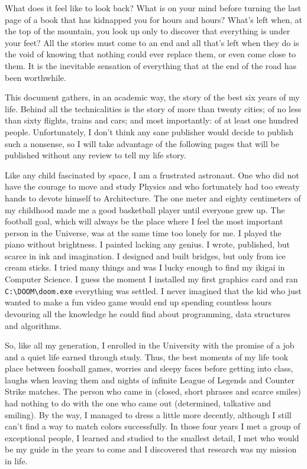What does it feel like to look back? What is on your mind before turning the last page of a book that has kidnapped you for hours and hours? What's left when, at the top of the mountain, you look up only to discover that everything is under your feet? All the stories must come to an end and all that's left when they do is the void of knowing that nothing could ever replace them, or even come close to them. It is the inevitable sensation of everything that at the end of the road has been worthwhile.

This document gathers, in an academic way, the story of the best six years of my life. Behind all the technicalities is the story of more than twenty cities; of no less than sixty flights, trains and cars; and most importantly: of at least one hundred people. Unfortunately, I don't think any sane publisher would decide to publish such a nonsense, so I will take advantage of the following pages that will be published without any review to tell my life story.

Like any child fascinated by space, I am a frustrated astronaut. One who did not have the courage to move and study Physics and who fortunately had too sweaty hands to devote himself to Architecture. The one meter and eighty centimeters of my childhood made me a good basketball player until everyone grew up. The football goal, which will always be the place where I feel the most important person in the Universe, was at the same time too lonely for me. I played the piano without brightness. I painted lacking any genius. I wrote, published, but scarce in ink and imagination. I designed and built bridges, but only from ice cream sticks. I tried many things and was I lucky enough to find my ikigai in Computer Science. I guess the moment I installed my first graphics card and ran \verb|C:\DOOM\doom.exe| everything was settled. I never imagined that the kid who just wanted to make a fun video game would end up spending countless hours devouring all the knowledge he could find about programming, data structures and algorithms.

So, like all my generation, I enrolled in the University with the promise of a job and a quiet life earned through study. Thus, the best moments of my life took place between foosball games, worries and sleepy faces before getting into class, laughs when leaving them and nights of infinite League of Legends and Counter Strike matches. The person who came in (closed, short phrases and scarce smiles) had nothing to do with the one who came out (determined, talkative and smiling). By the way, I managed to dress a little more decently, although I still can't find a way to match colors successfully. In those four years I met a group of exceptional people, I learned and studied to the smallest detail, I met who would be my guide in the years to come and I discovered that research was my mission in life.

